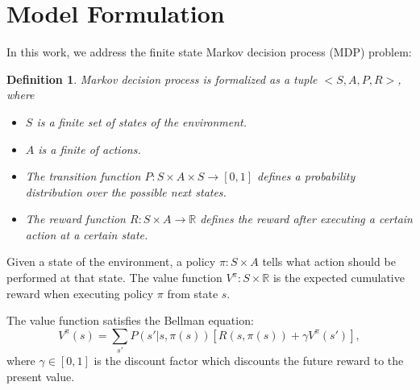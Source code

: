 \documentclass{article} %
\newtheorem{definition}{Definition}
\begin{document}



\section{Model Formulation}

In this work, we address the finite state Markov decision process (MDP) problem:
\begin{definition} Markov decision process is formalized as a tuple $<S, A, P, R>$, where
\begin{itemize}{}
\item $S$ is a finite set of states of the environment.
\item $A$ is a finite of actions.
\item The transition function $P:S \times A \times S \rightarrow [0, 1]$ defines a probability distribution over the possible next states. 
\item The reward function $R:S \times A \rightarrow \mathbb{R}$ defines the reward after executing a certain action at a certain state.
\end{itemize}
\end{definition}

Given a state of the environment, a policy $\pi: S \times A$ tells what action should be performed at that state. 
The value function $V^{\pi}: S \times \mathbb{R}$ is the expected cumulative reward when executing
policy $\pi$ from state $s$.

The value function satisfies the Bellman equation:
\begin{equation}
    V^{\pi}(s) = \sum_{s'}P(s'|s, \pi(s))[R(s, \pi(s)) + \gamma V^{\pi}(s')],
    \label{eq:V}
\end{equation}
where $\gamma \in [0, 1]$ is the discount factor which discounts the future reward to the present value.
\end{document}

